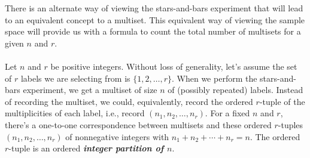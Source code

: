 \documentclass[12pt]{article}
\begin{document}
\noindent There is an alternate way of viewing the stars-and-bars experiment that
will lead to an equivalent concept to a multiset.  This equivalent way of viewing the sample space will
provide us with a formula to count the total number of multisets for a given $n$ and $r$.\\


\\
\noindent Let $n$ and $r$ be positive integers.  Without loss of generality, let's assume the set of $r$ labels
we are selecting from is $\{1,2,\dots,r\}$.  When we perform the stars-and-bars experiment, we get a multiset of size $n$
of (possibly repeated) labels.  Instead of recording the multiset, we could, equivalently, record the ordered $r$-tuple of the multiplicities of each label,
i.e., record $(n_1,n_2,\dots, n_r)$.  For a fixed $n$ and $r$, there's a one-to-one correspondence between multisets
and these ordered $r$-tuples $(n_1,n_2,\dots, n_r)$ of nonnegative integers with $n_1+n_2+\cdots + n_r=n$.
The ordered $r$-tuple is an ordered {\bf\em integer partition of $n$}.\\
\end{document}
